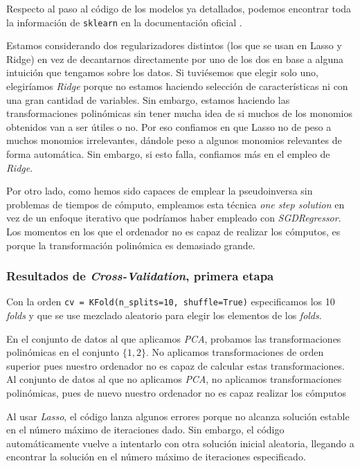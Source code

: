 \documentclass[11pt]{article}
\begin{document}
Respecto al paso al código de los modelos ya detallados, podemos encontrar toda la información de \lstinline{sklearn} en la documentación oficial \cite{sklearn_linear_models_list:online}.

Estamos considerando dos regularizadores distintos (los que se usan en Lasso y Ridge) en vez de decantarnos directamente por uno de los dos en base a alguna intuición que tengamos sobre los datos. Si tuviésemos que elegir solo uno, elegiríamos \emph{Ridge} porque no estamos haciendo selección de características ni con una gran cantidad de variables. Sin embargo, estamos haciendo las transformaciones polinómicas sin tener mucha idea de si muchos de los monomios obtenidos van a ser útiles o no. Por eso confiamos en que Lasso no de peso a muchos monomios irrelevantes, dándole peso a algunos monomios relevantes de forma automática. Sin embargo, si esto falla, confiamos más en el empleo de \emph{Ridge}.

Por otro lado, como hemos sido capaces de emplear la pseudoinversa sin problemas de tiempos de cómputo, empleamos esta técnica \emph{one step solution} en vez de un enfoque iterativo que podríamos haber empleado con \emph{SGDRegressor}. Los momentos en los que el ordenador no es capaz de realizar los cómputos, es porque la transformación polinómica es demasiado grande.

\subsubsection{Resultados de \emph{Cross-Validation}, primera etapa}

Con la orden \lstinline{cv = KFold(n_splits=10, shuffle=True)} especificamos los 10 \emph{folds} y que se use mezclado aleatorio para elegir los elementos de los \emph{folds}.

En el conjunto de datos al que aplicamos \emph{PCA}, probamos las transformaciones polinómicas en el conjunto $\{1, 2\}$. No aplicamos transformaciones de orden superior pues nuestro ordenador no es capaz de calcular estas transformaciones. Al conjunto de datos al que no aplicamos \emph{PCA}, no aplicamos transformaciones polinómicas, pues de nuevo nuestro ordenador no es capaz realizar los cómputos

Al usar \emph{Lasso}, el código lanza algunos errores porque no alcanza solución estable en el número máximo de iteraciones dado. Sin embargo, el código automáticamente vuelve a intentarlo con otra solución inicial aleatoria, llegando a encontrar la solución en el número máximo de iteraciones especificado.
\end{document}
